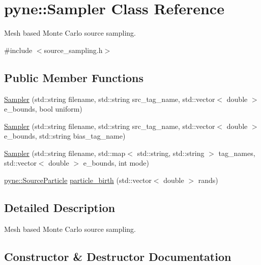 \hypertarget{classpyne_1_1_sampler}{}\section{pyne\+:\+:Sampler Class Reference}
\label{classpyne_1_1_sampler}


Mesh based Monte Carlo source sampling.  




{\ttfamily \#include $<$source\+\_\+sampling.\+h$>$}

\subsection*{Public Member Functions}
\begin{DoxyCompactItemize}
\item 
\hyperlink{classpyne_1_1_sampler_a57e096205922e6a221f2185a9849c5ed}{Sampler} (std\+::string filename, std\+::string src\+\_\+tag\+\_\+name, std\+::vector$<$ double $>$ e\+\_\+bounds, bool uniform)
\item 
\hyperlink{classpyne_1_1_sampler_a058411845da467ff7421956ba076ac31}{Sampler} (std\+::string filename, std\+::string src\+\_\+tag\+\_\+name, std\+::vector$<$ double $>$ e\+\_\+bounds, std\+::string bias\+\_\+tag\+\_\+name)
\item 
\hyperlink{classpyne_1_1_sampler_aa4b5811e49b8ac278e2e936d29500eb5}{Sampler} (std\+::string filename, std\+::map$<$ std\+::string, std\+::string $>$ tag\+\_\+names, std\+::vector$<$ double $>$ e\+\_\+bounds, int mode)
\item 
\hyperlink{classpyne_1_1_source_particle}{pyne\+::\+Source\+Particle} \hyperlink{classpyne_1_1_sampler_a2e5d98ef0f98a3093c32936ce6cc8cd2}{particle\+\_\+birth} (std\+::vector$<$ double $>$ rands)
\end{DoxyCompactItemize}


\subsection{Detailed Description}
Mesh based Monte Carlo source sampling. 

\subsection{Constructor \& Destructor Documentation}
\mbox{\label{classpyne_1_1_sampler_a57e096205922e6a221f2185a9849c5ed}} 
